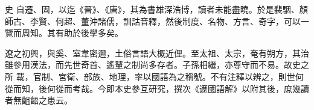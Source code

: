 
\begin{pinyinscope}

 史
 自遷、固，以迄《晉》、《唐》，其為書雄深浩博，讀者未能盡曉。於是裴駰、顏師古、李賢、何超、董沖諸儒，訓詁音釋，然後制度、名物、方言、奇字，可以一覽而周知。其有助於後學多矣。



 遼之初興，與奚、室韋密邇，土俗言語大概近俚。至太祖、太宗，奄有朔方，其治雖參用漢法，而先世奇首、遙輦之制尚多存者。子孫相繼，亦尊守而不易。故史之所
 載，官制、宮衛、部族、地理，率以國語為之稱號。不有注釋以辨之，則世何從而知，後何從而考哉。今即本史參互研究，撰次《遼國語解》以附其後，庶幾讀者無齟齬之患云。



\end{pinyinscope}